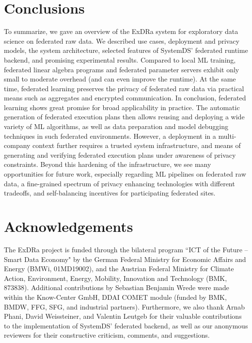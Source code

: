 \documentclass[sigconf,screen]{acmart}
\begin{document}
\section{Conclusions}

To summarize, we gave an overview of the ExDRa system for exploratory data science on federated raw data. We described use cases, deployment and privacy models, the system architecture, selected features of SystemDS' federated runtime backend, and promising experimental results. Compared to local ML training, federated linear algebra programs and federated parameter servers exhibit only small to moderate overhead (and can even improve the runtime). At the same time, federated learning preserves the privacy of federated raw data via practical means such as aggregates and encrypted communication. In conclusion, federated learning shows great promise for broad applicability in practice. The automatic generation of federated execution plans then allows reusing and deploying a wide variety of ML algorithms, as well as data preparation and model debugging techniques in such federated environments. However, a deployment in a multi-company context further requires a trusted system infrastructure, and means of generating and verifying federated execution plans under awareness of privacy constraints. Beyond this hardening of the infrastructure, we see many opportunities for future work, especially regarding ML pipelines on federated raw data, a fine-grained spectrum of privacy enhancing technologies with different tradeoffs, and self-balancing incentives for participating federated sites.


\section*{Acknowledgements}
The ExDRa project is funded through the bilateral program ``ICT of the Future -- Smart Data Economy" by the German Federal Ministry for Economic Affairs and Energy (BMWi, 01MD19002), and the Austrian Federal Ministry for Climate Action, Environment, Energy, Mobility, Innovation and Technology (BMK, 873838). Additional contributions by Sebastian Benjamin Wrede were made within the Know-Center GmbH, DDAI COMET module (funded by BMK, BMDW, FFG, SFG, and industrial partners). Furthermore, we also thank Arnab Phani, David Weissteiner, and Valentin Leutgeb for their valuable contributions to the implementation of SystemDS' federated backend, as well as our anonymous reviewers for their constructive criticism, comments, and suggestions.

\balance


  
\end{document}
